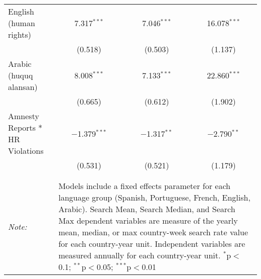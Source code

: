 \begin{table}[!htbp]
\begin{tabular}{@{\extracolsep{5pt}}lccc}
  English (human rights) & 7.317$^{***}$ & 7.046$^{***}$ & 16.078$^{***}$ \\ 
  & (0.518) & (0.503) & (1.137) \\ 
  Arabic (huquq alansan) & 8.008$^{***}$ & 7.133$^{***}$ & 22.860$^{***}$ \\ 
  & (0.665) & (0.612) & (1.902) \\ 
  Amnesty Reports * HR Violations & $-$1.379$^{***}$ & $-$1.317$^{**}$ & $-$2.790$^{**}$ \\ 
  & (0.531) & (0.521) & (1.179) \\ 
 \hline \\[-1.8ex] 
\hline 
\hline \\[-1.8ex] 
\textit{Note:}  & \multicolumn{3}{l}{\parbox[t]{8cm}{Models include a fixed effects parameter for each language group (Spanish, Portuguese, French, English, Arabic). Search Mean, Search Median, and Search Max dependent variables are measure of the yearly mean, median, or max country-week search rate value for each country-year unit. Independent variables are measured annually for each country-year unit. $^{*}$p$<$0.1; $^{**}$p$<$0.05; $^{***}$p$<$0.01}} \\ 
\end{tabular} 
\end{table} 
